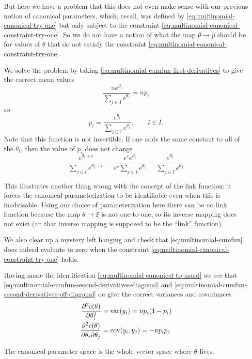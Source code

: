 But here we have a problem that this does not even make sense with our
previous notion of canonical parameters, which, recall, was defined
by \eqref{eq:multinomial-canonical-try-one} but only subject to the
constraint \eqref{eq:multinomial-canonical-constraint-try-one}.
So we do not have a notion of what the map $\theta \to p$ should be
for values of $\theta$ that do not satisfy the
constraint \eqref{eq:multinomial-canonical-constraint-try-one}.

We solve the problem by taking \eqref{eq:multinomial-cumfun-first-derivatives}
to give the correct mean values
$$
   \frac{n e^{\theta_i}}{\sum_{j \in I} e^{\theta_j}} = n p_i
$$
so
\begin{equation} \label{eq:multinomial-canonical-to-usual}
   p_i = \frac{e^{\theta_i}}{\sum_{j \in I} e^{\theta_j}}, \qquad i \in I.
\end{equation}
Note that this function is not invertible.  If one adds the same constant
to all of the $\theta_i$, then the value of $p_i$ does not change
$$
   \frac{e^{\theta_i + c}}{\sum_{j \in I} e^{\theta_j + c}}
   =
   \frac{e^c e^{\theta_i}}{e^c \sum_{j \in I} e^{\theta_j}}
   =
   \frac{e^{\theta_i}}{\sum_{j \in I} e^{\theta_j}}
$$

This illustrates another thing wrong with the concept of the link function:
it forces the canonical parameterization to be identifiable even when this
is inadvisable.  Using our choice of parameterization here there can be
no link function because the map $\theta \to \xi$ is not one-to-one, so
its inverse mapping does not exist (an that inverse mapping is supposed to
be the ``link'' function).

We also clear up a mystery left hanging and check
that \eqref{eq:multinomial-cumfun} does indeed evaluate to zero when the
constraint \eqref{eq:multinomial-canonical-constraint-try-one} holds.

Having made the identification \eqref{eq:multinomial-canonical-to-usual}
we see that \eqref{eq:multinomial-cumfun-second-derivatives-diagonal}
and \eqref{eq:multinomial-cumfun-second-derivatives-off-diagonal}
do give the correct variances and covariances
\begin{align*}
   \frac{\partial^2 c(\theta)}{\partial \theta_i^2}
   & =
   \operatorname{var}(y_i) = n p_i (1 - p_i)
   \\
   \frac{\partial^2 c(\theta)}{\partial \theta_i \partial \theta_j}
   & =
   \operatorname{cov}(y_i, y_j) = - n p_i p_j
\end{align*}

The canonical parameter space is the whole vector space where $\theta$ lives.

